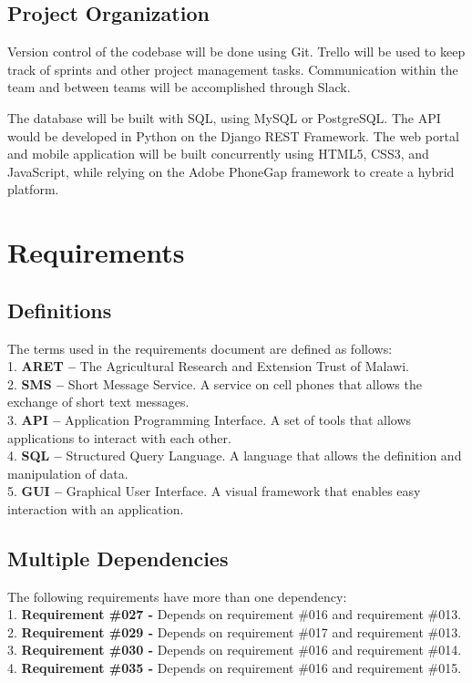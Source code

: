 \documentclass[12pt,letterpaper]{article}
\begin{document}
\subsection{Project Organization}
Version control of the codebase will be done using Git. Trello will be used to keep track of sprints and other project management tasks. Communication within the team and between teams will be accomplished through Slack.\par
The database will be built with SQL, using MySQL or PostgreSQL. The API would be developed in Python on the Django REST Framework. The web portal and mobile application will be built concurrently using HTML5, CSS3, and JavaScript, while relying on the Adobe PhoneGap framework to create a hybrid platform.

\clearpage
\section{Requirements}
\subsection{Definitions}
The terms used in the requirements document are defined as follows:\\
1. \hspace*{5pt} \textbf{ARET -- } The Agricultural Research and Extension Trust of Malawi. \\
2. \hspace*{5pt} \textbf{SMS -- } Short Message Service. A service on cell phones that allows the exchange of short text messages.\\
3. \hspace*{5pt} \textbf{API -- } Application Programming Interface. A set of tools that allows applications to interact with each other.\\
4. \hspace*{5pt} \textbf{SQL -- } Structured Query Language. A language that allows the definition and manipulation of data.\\
5. \hspace*{5pt} \textbf{GUI -- } Graphical User Interface. A visual framework that enables easy interaction with an application.

\subsection{Multiple Dependencies}
The following requirements have more than one dependency: \\
1. \textbf{Requirement \#027 -} Depends on requirement \#016 and requirement \#013. \\
2. \textbf{Requirement \#029 -} Depends on requirement \#017 and requirement \#013. \\
3. \textbf{Requirement \#030 -} Depends on requirement \#016 and requirement \#014. \\
4. \textbf{Requirement \#035 -} Depends on requirement \#016 and requirement \#015.
\end{document}
